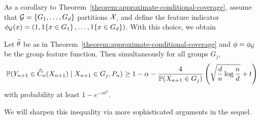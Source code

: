 \documentclass{article}
\newcommand{\radphi}{b_{\phi}}
\newcommand{\loss}{\ell}
\newcommand{\scorefunc}{s}
\newcommand{\scoreval}{\scorefunc}
\newcommand{\scorerv}{S}
\begin{document}

As a corollary to Theorem~\ref{theorem:approximate-conditional-coverage},
assume that $\mathcal{G} = \{G_1, \ldots, G_d\}$ partitions $\mathcal{X}$, and define
the feature indicator $\phi_{\mathcal{G}}(x) = (1, 1\!\left\{x \in G_1\right\}, \ldots,
1\!\left\{x \in G_d\right\})$.
%
With this choice, we obtain
\begin{corollary}
  \label{corollary:group-conditional-baby}
  Let $\widehat{\theta}$ be as in
  Theorem~\ref{theorem:approximate-conditional-coverage}
  and $\phi = \phi_{\mathcal{G}}$ be the group feature function.
  Then simultaneously for all groups $G_j$,
  \begin{equation*}
    \mathbb{P}(Y_{n + 1} \in \widehat{C}_n(X_{n + 1}) \mid X_{n + 1} \in G_j, P_n)
    \ge 1 - \alpha - \frac{4}{\mathbb{P}(X_{n + 1} \in G_j)}
    \left(\sqrt{\frac{d}{n} \log \frac{n}{d}} + t \right)
  \end{equation*}
  with probability at least $1 - e^{-nt^2}$.
\end{corollary}
\noindent
We will sharpen this inequality via more sophisticated
arguments in the sequel.
\end{document}

